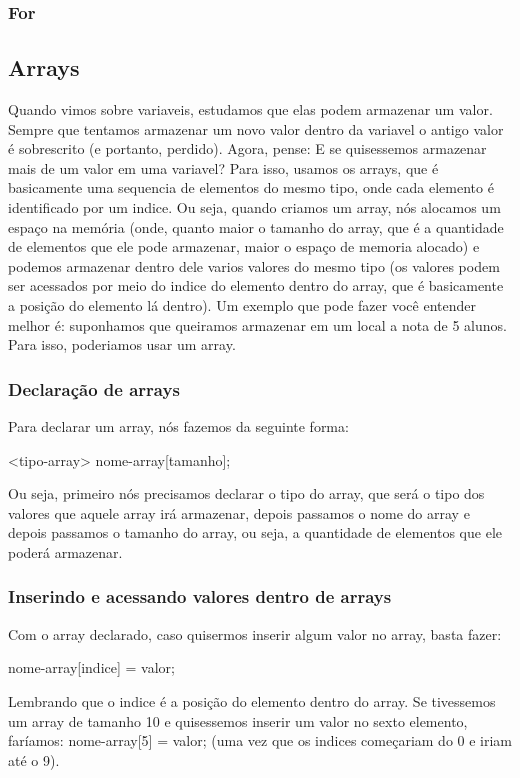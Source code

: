 \documentclass{report}
\begin{document}
	\subsubsection{For}
	\subsection{Arrays}
	Quando vimos sobre variaveis, estudamos que elas podem armazenar um valor. Sempre que tentamos armazenar um novo valor dentro da variavel o antigo valor é sobrescrito (e portanto, perdido). Agora, pense: E se quisessemos armazenar mais de um valor em uma variavel? Para isso, usamos os arrays, que é basicamente uma sequencia de elementos do mesmo tipo, onde cada elemento é identificado por um indice. Ou seja, quando criamos um array, nós alocamos um espaço na memória (onde, quanto maior o tamanho do array, que é a quantidade de elementos que ele pode armazenar, maior o espaço de memoria alocado) e podemos armazenar dentro dele varios valores do mesmo tipo (os valores podem ser acessados por meio do indice do elemento dentro do array, que é basicamente a posição do elemento lá dentro). Um exemplo que pode fazer você entender melhor é: suponhamos que queiramos armazenar em um local a nota de 5 alunos. Para isso, poderiamos usar um array.
	\subsubsection{Declaração de arrays}
	Para declarar um array, nós fazemos da seguinte forma:
	
	\begin{LARGE}
		\begin{center}
			<tipo-array> nome-array[tamanho];
		\end{center}
	\end{LARGE}
	
	Ou seja, primeiro nós precisamos declarar o tipo do array, que será o tipo dos valores que aquele array irá armazenar, depois passamos o nome do array e depois passamos o tamanho do array, ou seja, a quantidade de elementos que ele poderá armazenar.
	
	
	
	\subsubsection{Inserindo e acessando valores dentro de arrays}
	Com o array declarado, caso quisermos inserir algum valor no array, basta fazer: 
	
	\begin{LARGE}
		\begin{center}
			nome-array[indice] = valor;
		\end{center}
	\end{LARGE}
	Lembrando que o indice é a posição do elemento dentro do array. Se tivessemos um array de tamanho 10 e quisessemos inserir um valor no sexto elemento, faríamos: nome-array[5] = valor; (uma vez que os indices começariam do 0 e iriam até o 9).
	
\end{document}
